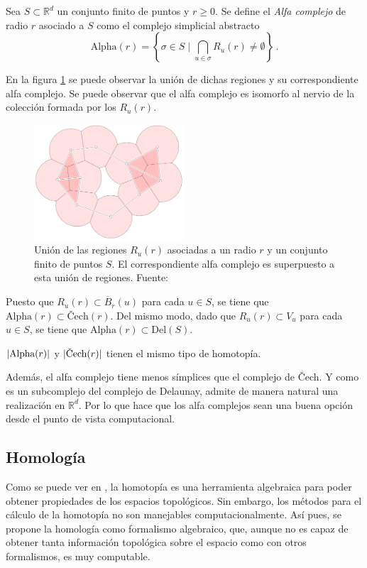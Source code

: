 \begin{definition}
Sea $S \subset \mathbb{R}^d$ un conjunto finito de puntos y $r \geq 0$. Se define el \emph{Alfa complejo} de radio $r$ asociado a $S$ como el complejo simplicial abstracto
\[
\text{Alpha}(r)=\left\{\sigma \in S \mid \bigcap_{u \in \sigma}R_u(r) \neq \emptyset \right\}\,.
\]
\end{definition}

En la figura \ref{ref:alpha} se puede observar la unión de dichas regiones y su correspondiente alfa complejo. Se puede observar que el alfa complejo es isomorfo al nervio de la colección formada por los $R_u(r)$.

\begin{figure}[!ht]
\centering
\includegraphics[width=0.5\textwidth]{include/figuras/alpha.png} 
\caption{Unión de las regiones $R_u(r)$ asociadas a un radio $r$ y un conjunto finito de puntos $S$. El correspondiente alfa complejo es superpuesto a esta unión de regiones. Fuente: \cite{libroEH}}
\label{ref:alpha}
\end{figure}

Puesto que $R_u(r) \subset \overline{B}_r(u)$ para cada $u \in S$, se tiene que $\text{Alpha}(r) \subset \text{\v{C}ech}(r)$. Del mismo modo, dado que $R_u(r) \subset V_u$ para cada $u \in S$, se tiene que $\text{Alpha}(r) \subset \text{Del}(S)$.

\begin{property}
$\lvert\text{\rm Alpha}(r)\rvert$ y $\abs{\text{\rm \v{C}ech}(r)}$ tienen el mismo tipo de homotopía.
\end{property}

Además, el alfa complejo tiene menos símplices que el complejo de \v{C}ech. Y como es un subcomplejo del complejo de Delaunay, admite de manera natural una realización en $\mathbb{R}^d$. Por lo que hace que los alfa complejos sean una buena opción desde el punto de vista computacional.

\subsection{Homología}
Como se puede ver en \cite{Hatcher}, la homotopía es una herramienta algebraica para poder obtener propiedades de los espacios topológicos. Sin embargo, los métodos para el cálculo de la homotopía no son manejables computacionalmente. Así pues, se propone la homología como formalismo algebraico, que, aunque no es capaz de obtener tanta información topológica sobre el espacio como con otros formalismos, es muy computable.


